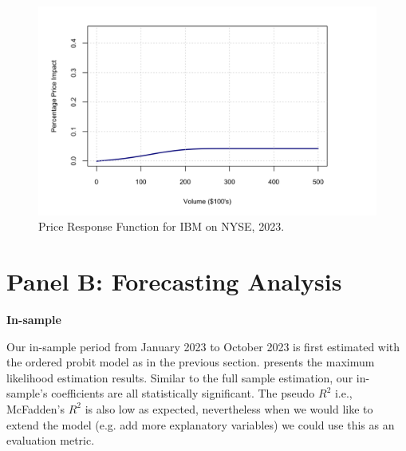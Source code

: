 \begin{figure}[H]
    \centering
    \includegraphics[width=1.1\textwidth]{figures/main_results/price_response.png}
    \caption{Price Response Function for IBM on NYSE, 2023.}
    \label{fig:figure-2}
\end{figure}


\clearpage



\section{Panel B: Forecasting Analysis}

{\noindent\bfseries In-sample }

Our in-sample period from January 2023 to October 2023 is first estimated with the ordered probit model as in the previous section.  presents the maximum likelihood estimation results. Similar to the full sample estimation, our in-sample's coefficients are all statistically significant. The pseudo $R^2$ i.e., McFadden's $R^2$ is also low as expected, nevertheless when we would like to extend the model (e.g. add more explanatory variables) we could use this as an evaluation metric.






